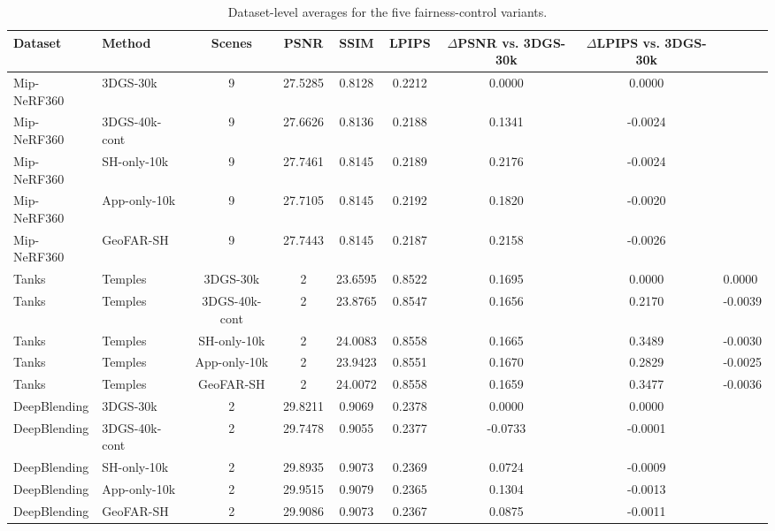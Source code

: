 ﻿\begin{table}[t]
\centering
\caption{Dataset-level averages for the five fairness-control variants.}
\label{tab:dataset_level_results}
\small
\begin{tabular}{llcccccc}
\hline
Dataset & Method & Scenes & PSNR & SSIM & LPIPS & $\Delta$PSNR vs. 3DGS-30k & $\Delta$LPIPS vs. 3DGS-30k \\
\hline
Mip-NeRF360 & 3DGS-30k & 9 & 27.5285 & 0.8128 & 0.2212 & 0.0000 & 0.0000 \\
Mip-NeRF360 & 3DGS-40k-cont & 9 & 27.6626 & 0.8136 & 0.2188 & 0.1341 & -0.0024 \\
Mip-NeRF360 & SH-only-10k & 9 & 27.7461 & 0.8145 & 0.2189 & 0.2176 & -0.0024 \\
Mip-NeRF360 & App-only-10k & 9 & 27.7105 & 0.8145 & 0.2192 & 0.1820 & -0.0020 \\
Mip-NeRF360 & GeoFAR-SH & 9 & 27.7443 & 0.8145 & 0.2187 & 0.2158 & -0.0026 \\
Tanks&Temples & 3DGS-30k & 2 & 23.6595 & 0.8522 & 0.1695 & 0.0000 & 0.0000 \\
Tanks&Temples & 3DGS-40k-cont & 2 & 23.8765 & 0.8547 & 0.1656 & 0.2170 & -0.0039 \\
Tanks&Temples & SH-only-10k & 2 & 24.0083 & 0.8558 & 0.1665 & 0.3489 & -0.0030 \\
Tanks&Temples & App-only-10k & 2 & 23.9423 & 0.8551 & 0.1670 & 0.2829 & -0.0025 \\
Tanks&Temples & GeoFAR-SH & 2 & 24.0072 & 0.8558 & 0.1659 & 0.3477 & -0.0036 \\
DeepBlending & 3DGS-30k & 2 & 29.8211 & 0.9069 & 0.2378 & 0.0000 & 0.0000 \\
DeepBlending & 3DGS-40k-cont & 2 & 29.7478 & 0.9055 & 0.2377 & -0.0733 & -0.0001 \\
DeepBlending & SH-only-10k & 2 & 29.8935 & 0.9073 & 0.2369 & 0.0724 & -0.0009 \\
DeepBlending & App-only-10k & 2 & 29.9515 & 0.9079 & 0.2365 & 0.1304 & -0.0013 \\
DeepBlending & GeoFAR-SH & 2 & 29.9086 & 0.9073 & 0.2367 & 0.0875 & -0.0011 \\
\hline
\end{tabular}
\end{table}




